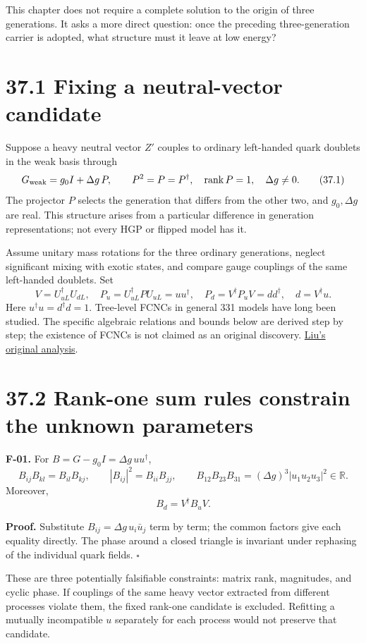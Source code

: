 \documentclass[
  11pt,
  oneside]{book}
\begin{document}
This chapter does not require a complete solution to the origin of three
generations. It asks a more direct question: once the preceding
three-generation carrier is adopted, what structure must it leave at low
energy?

\section{37.1 Fixing a neutral-vector candidate}

Suppose a heavy neutral vector \(Z'\) couples to ordinary left-handed
quark doublets in the weak basis through \[
G_{\rm weak}=g_0I+\Delta g\,P,\qquad P^2=P=P^\dagger,\quad
\operatorname{rank}P=1,\quad \Delta g\ne0.
\tag{37.1}
\] The projector \(P\) selects the generation that differs from the
other two, and \(g_0,\Delta g\) are real. This structure arises from a
particular difference in generation representations; not every HGP or
flipped model has it.

Assume unitary mass rotations for the three ordinary generations,
neglect significant mixing with exotic states, and compare gauge
couplings of the same left-handed doublets. Set \[
V=U_{uL}^\dagger U_{dL},\quad
P_u=U_{uL}^\dagger PU_{uL}=uu^\dagger,\quad
P_d=V^\dagger P_uV=dd^\dagger,\quad d=V^\dagger u.
\tag{37.2}
\] Here \(u^\dagger u=d^\dagger d=1\). Tree-level FCNCs in general 331
models have long been studied. The specific algebraic relations and
bounds below are derived step by step; the existence of FCNCs is not
claimed as an original discovery.
\href{https://arxiv.org/abs/hep-ph/9312312}{Liu's original analysis}.

\section{37.2 Rank-one sum rules constrain the unknown parameters}

\label{f-01}{}

\textbf{F-01.} For \(B=G-g_0I=\Delta g\,uu^\dagger\), \[
B_{ij}B_{kl}=B_{il}B_{kj},\qquad
|B_{ij}|^2=B_{ii}B_{jj},\qquad
B_{12}B_{23}B_{31}=(\Delta g)^3|u_1u_2u_3|^2\in\mathbb R.
\tag{37.3}
\] Moreover, \[
B_d=V^\dagger B_uV.
\tag{37.4}
\]

\textbf{Proof.} Substitute \(B_{ij}=\Delta g\,u_i\bar u_j\) term by
term; the common factors give each equality directly. The phase around a
closed triangle is invariant under rephasing of the individual quark
fields. \(\square\)

These are three potentially falsifiable constraints: matrix rank,
magnitudes, and cyclic phase. If couplings of the same heavy vector
extracted from different processes violate them, the fixed rank-one
candidate is excluded. Refitting a mutually incompatible \(u\)
separately for each process would not preserve that candidate.
\end{document}
